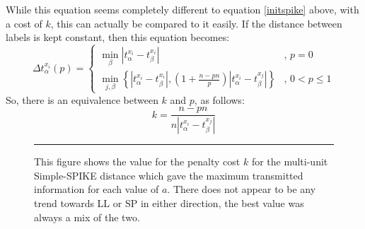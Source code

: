 While this equation seems completely different to equation \ref{initspike} above, with a cost of $k$, this can actually be compared to it easily.  If the distance between labels is kept constant, then this equation becomes:
\begin{equation}
\Delta t_{\alpha}^{x_i}(p) = \left\{ \begin{array}{ll} \min_{\beta} | t_{\alpha}^{x_i} - t_{\beta}^{x_i} | & , \, p=0 \\
\min_{j,\beta}\left\{  | t_{\alpha}^{x_i} - t_{\beta}^{x_i} |,\left(1+\frac{n-pn}{p} \right) | t_{\alpha}^{x_i} - t_{\beta}^{x_j} |\right\} & , \, 0<p\leq1 \end{array}\right.
\end{equation}
So, there is an equivalence between $k$ and $p$, as follows:
\begin{equation}
k = \frac{n-pn}{n | t_{\alpha}^{x_i} - t_{\beta}^{x_j} |}
\end{equation}

%
%

% 
%

  \begin{figure}[htb]
  \begin{center}
  \resizebox{0.75\textwidth}{!}{}
  \end{center}
\rule{31.5em}{0.5pt}
\caption{\label{bestkadds}This figure shows the value for the penalty cost $k$ for the multi-unit Simple-SPIKE distance which gave the maximum transmitted information for each value of $a$.  There does not appear to be any trend towards LL or SP in either direction, the best value was always a mix of the two.}
\end{figure}


